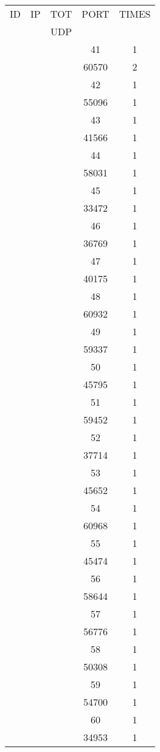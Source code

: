 \documentclass[a4paper]{scrartcl}
\begin{document}
\begin{minipage}[b]{0.5\linewidth}
\begin{tabular}{| c | c | c | c | c |}
\hline
ID & IP & TOT & PORT & TIMES \\ 
   &    & UDP &      &       \\ 
\hline
& & & 41 & 1 \\ & & & 60570 & 2 \\ & & & 42 & 1 \\ & & & 55096 & 1 \\ & & & 43 & 1 \\ & & & 41566 & 1 \\ & & & 44 & 1 \\ & & & 58031 & 1 \\ & & & 45 & 1 \\ & & & 33472 & 1 \\ & & & 46 & 1 \\ & & & 36769 & 1 \\ & & & 47 & 1 \\ & & & 40175 & 1 \\ & & & 48 & 1 \\ & & & 60932 & 1 \\ & & & 49 & 1 \\ & & & 59337 & 1 \\ & & & 50 & 1 \\ & & & 45795 & 1 \\ & & & 51 & 1 \\ & & & 59452 & 1 \\ & & & 52 & 1 \\ & & & 37714 & 1 \\ & & & 53 & 1 \\ & & & 45652 & 1 \\ & & & 54 & 1 \\ & & & 60968 & 1 \\ & & & 55 & 1 \\ & & & 45474 & 1 \\ & & & 56 & 1 \\ & & & 58644 & 1 \\ & & & 57 & 1 \\ & & & 56776 & 1 \\ & & & 58 & 1 \\ & & & 50308 & 1 \\ & & & 59 & 1 \\ & & & 54700 & 1 \\ & & & 60 & 1 \\ & & & 34953 & 1 \\ \hline\end{tabular}\end{minipage} \hfill\begin{minipage}[b]{0.5\linewidth}\begin{tabular}{| c | c | c | c | c |}

\end{tabular}
\end{minipage}
\end{document}
